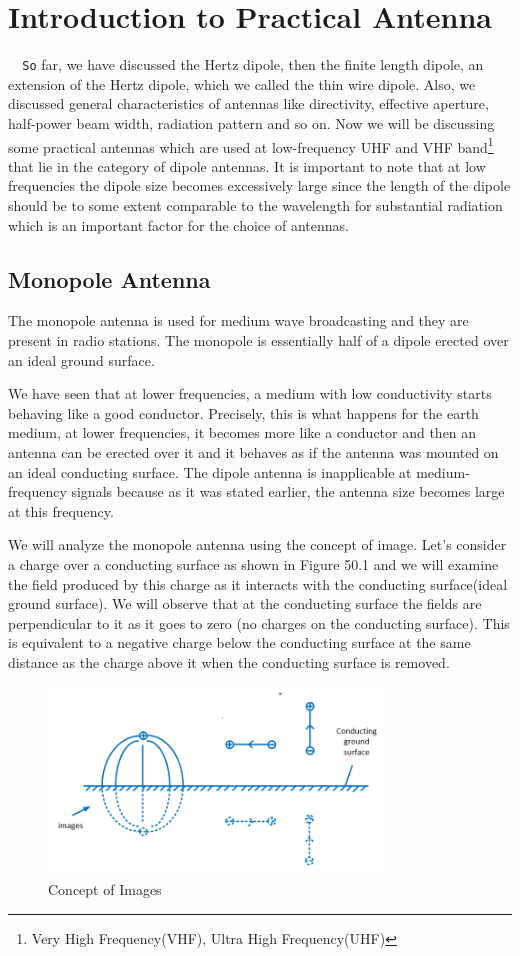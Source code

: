 \chapter{Introduction to Practical Antenna}
\verb|	So| far, we have discussed the Hertz dipole, then the finite length dipole, an extension of the Hertz dipole, which we called the thin wire dipole. Also, we discussed general characteristics of antennas like directivity, effective aperture, half-power beam width, radiation pattern and so on. Now we will be discussing some practical antennas which are used at low-frequency UHF and VHF band\footnote{Very High Frequency(VHF), Ultra High Frequency(UHF)} that lie in the category of dipole antennas. It is important to note that at low frequencies the dipole size becomes excessively large since the length of the dipole should be to some extent comparable to the wavelength for substantial radiation which is an important factor for the choice of antennas.


\section{Monopole Antenna}The monopole antenna is used for medium wave broadcasting and they are present in radio stations. The monopole is essentially half of a dipole erected over an ideal ground surface.

We have seen that at lower frequencies, a medium with low conductivity starts behaving like a good conductor. Precisely, this is what happens for the earth medium, at lower frequencies, it becomes more like a conductor and then an antenna can be erected over it and it behaves as if the antenna was mounted on an ideal conducting surface. The dipole antenna is inapplicable at medium-frequency signals because as it was stated earlier, the antenna size becomes large at this frequency.

We will analyze the monopole antenna using the concept of image. Let's consider a charge over a conducting surface as shown in Figure 50.1 and we will examine the field produced by this charge as it interacts with the conducting surface(ideal ground surface). We will observe that at the conducting surface the fields are perpendicular to it as it goes to zero (no charges on the conducting surface). This is equivalent to a negative charge below the conducting surface at the same distance as the charge above it when the conducting surface is removed. 
\begin{figure}[h]
\centering
\includegraphics[height=5cm]{./graphics/image53_1}
\caption{Concept of Images}
\label{fig:fig50.1}
\end{figure}

